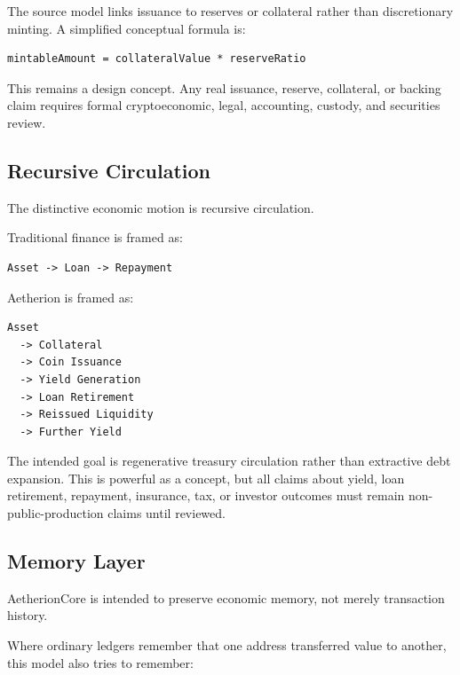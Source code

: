 ﻿\documentclass[12pt]{article}
\begin{document}
The source model links issuance to reserves or collateral rather than discretionary minting. A simplified conceptual formula is:

\begin{verbatim}
mintableAmount = collateralValue * reserveRatio
\end{verbatim}

This remains a design concept. Any real issuance, reserve, collateral, or backing claim requires formal cryptoeconomic, legal, accounting, custody, and securities review.

\subsection{Recursive Circulation}


The distinctive economic motion is recursive circulation.

Traditional finance is framed as:

\begin{verbatim}
Asset -> Loan -> Repayment
\end{verbatim}

Aetherion is framed as:

\begin{verbatim}
Asset
  -> Collateral
  -> Coin Issuance
  -> Yield Generation
  -> Loan Retirement
  -> Reissued Liquidity
  -> Further Yield
\end{verbatim}

The intended goal is regenerative treasury circulation rather than extractive debt expansion. This is powerful as a concept, but all claims about yield, loan retirement, repayment, insurance, tax, or investor outcomes must remain non-public-production claims until reviewed.

\subsection{Memory Layer}


AetherionCore is intended to preserve economic memory, not merely transaction history.

Where ordinary ledgers remember that one address transferred value to another, this model also tries to remember:
\end{document}
